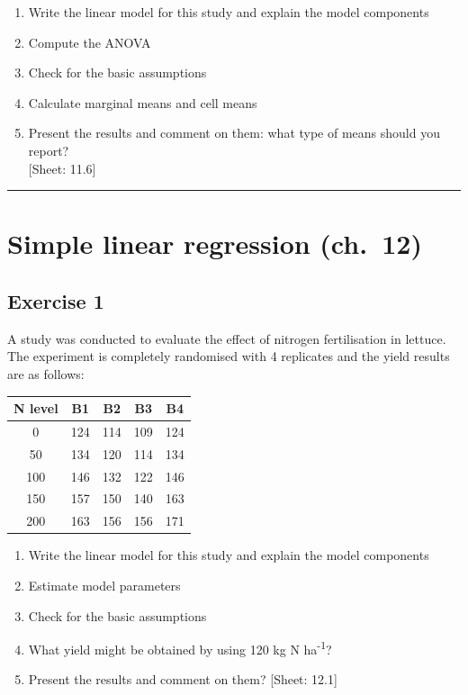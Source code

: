 \documentclass[a4paper,12pt,oneside]{book}
\providecommand{\tightlist}{%
  \setlength{\itemsep}{0pt}\setlength{\parskip}{0pt}}
\begin{document}
\begin{enumerate}
\def\labelenumi{\arabic{enumi}.}
\tightlist
\item
  Write the linear model for this study and explain the model components
\item
  Compute the ANOVA
\item
  Check for the basic assumptions
\item
  Calculate marginal means and cell means
\item
  Present the results and comment on them: what type of means should you report?\\
  {[}Sheet: 11.6{]}
\end{enumerate}

\begin{center}\rule{0.5\linewidth}{0.5pt}\end{center}

\hypertarget{simple-linear-regression-ch.-12}{%
\section{Simple linear regression (ch.~12)}\label{simple-linear-regression-ch.-12}}

\hypertarget{exercise-1-7}{%
\subsection{Exercise 1}\label{exercise-1-7}}

A study was conducted to evaluate the effect of nitrogen fertilisation in lettuce. The experiment is completely randomised with 4 replicates and the yield results are as follows:

\begin{longtable}[]{@{}ccccc@{}}
\toprule
N level & B1 & B2 & B3 & B4 \\
\midrule
\endhead
0 & 124 & 114 & 109 & 124 \\
50 & 134 & 120 & 114 & 134 \\
100 & 146 & 132 & 122 & 146 \\
150 & 157 & 150 & 140 & 163 \\
200 & 163 & 156 & 156 & 171 \\
\bottomrule
\end{longtable}

\begin{enumerate}
\def\labelenumi{\arabic{enumi}.}
\tightlist
\item
  Write the linear model for this study and explain the model components
\item
  Estimate model parameters
\item
  Check for the basic assumptions
\item
  What yield might be obtained by using 120 kg N ha\textsuperscript{-1}?
\item
  Present the results and comment on them?
  {[}Sheet: 12.1{]}
\end{enumerate}
\end{document}
